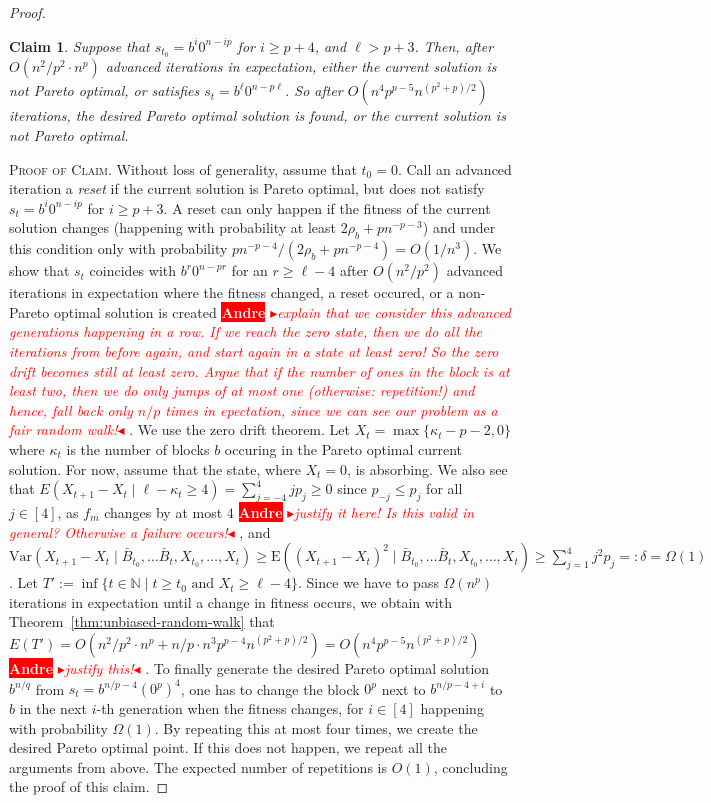 \documentclass[
sigconf = false, %
review = false, %
screen = true, %
anonymous = true, %
format=acmsmall
]{acmart}
\newcommand*{\E}{\mathrm{E}}
\newtheorem{claim}{Claim}
\newenvironment{proofofclaim}{\textsc{Proof of Claim.}}{\hfill\scriptsize\scalebox{1}{$\blacksquare$}}
\newcommand{\nbc}[3]{
		{\colorbox{#3}{\bfseries\sffamily\scriptsize\textcolor{white}{#1}}}
		{\textcolor{#3}{\sf\small$\blacktriangleright$\textit{#2}$\blacktriangleleft$}}
}
\newcommand{\andre}[1]{\nbc{Andre}{#1}{red}}
\begin{document}
\begin{proof}
\begin{claim}
	\label{cl:reachfinalpoint}
	Suppose that $s_{t_0} =b^{i}0^{n-ip}$ for $i \geq p+4$, and $\ell > p+3$. Then, after $O(n^2/p^2 \cdot n^p)$ advanced iterations in expectation, either the current solution is not Pareto optimal, or satisfies $s_t =b^\ell 0^{n-p\ell}$. So after $O(n^4p^{p-5} n^{(p^2+p)/2})$ iterations, the desired Pareto optimal solution is found, or the current solution is not Pareto optimal.
\end{claim}

\begin{proofofclaim}
Without loss of generality, assume that $t_0=0$. Call an advanced iteration a \emph{reset} if the current solution is Pareto optimal, but does not satisfy $s_t=b^i0^{n-ip}$ for $i \geq p+3$. A reset can only happen if the fitness of the current solution changes (happening with probability at least $2\rho_b + pn^{-p-3}$) and under this condition only with probability $pn^{-p-4} / (2\rho_b + pn^{-p-4}) = O(1/n^3)$. We show that $s_t$ coincides with $b^r0^{n-pr}$ for an $r \geq \ell-4$ after $O(n^2/p^2)$ advanced iterations in expectation where the fitness changed, a reset occured, or a non-Pareto optimal solution is created \andre{explain that we consider this advanced generations happening in a row. If we reach the zero state, then we do all the iterations from before again, and start again in a state at least zero! So the zero drift becomes still at least zero. Argue that if the number of ones in the block is at least two, then we do only jumps of at most one (otherwise: repetition!) and hence, fall back only $n/p$ times in epectation, since we can see our problem as a fair random walk!}. We use the zero drift theorem. Let $X_t=\max\{\kappa_t-p-2,0\}$ where $\kappa_t$ is the number of blocks $b$ occuring in the Pareto optimal current solution. For now, assume that the state, where $X_t=0$, is absorbing. We also see that $E(X_{t+1}-X_t \mid \ell - \kappa_t \geq 4) = \sum_{j=-4}^4 j p_j \geq 0$ since $p_{-j} \leq p_j$ for all $j \in [4]$, as $f_m$ changes by at most $4$ \andre{justify it here! Is this valid in general? Otherwise a failure occurs!}, and $\text{Var}(X_{t+1}-X_t \mid \bar{B}_{t_0}, \ldots \bar{B}_t, X_{t_0}, \ldots , X_t) \geq \E((X_{t+1}-X_t)^2 \mid \bar{B}_{t_0}, \ldots \bar{B}_t, X_{t_0}, \ldots , X_t) \geq \sum_{j=1}^4 j^2 p_j =:\delta = \Omega(1)$. Let $T':=\inf\{t \in \mathbb{N} \mid t \geq t_0 \text{ and } X_t \geq \ell-4\}$. Since we have to pass $\Omega(n^p)$ iterations in expectation until a change in fitness occurs, we obtain with Theorem~\ref{thm:unbiased-random-walk} that $E(T') = O(n^2/p^2 \cdot n^p + n/p \cdot n^3p^{p-4} n^{(p^2+p)/2}) = O(n^4p^{p-5} n^{(p^2+p)/2})$ \andre{justify this!}. To finally generate the desired Pareto optimal solution $b^{n/q}$ from $s_t=b^{n/p-4}(0^p)^4$, one has to change the block $0^p$ next to $b^{n/p-4+i}$ to $b$ in the next $i$-th generation when the fitness changes, for $i \in [4]$ happening with probability $\Omega(1)$. By repeating this at most four times, we create the desired Pareto optimal point. If this does not happen, we repeat all the arguments from above. The expected number of repetitions is $O(1)$, concluding the proof of this claim.       

\end{proofofclaim}
\end{proof}
\end{document}
